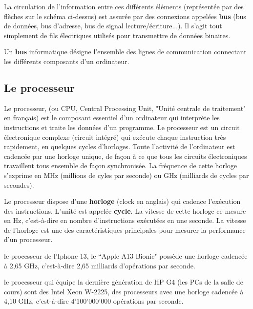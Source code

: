 La circulation de l’information entre ces différents éléments (représentée par des flèches sur le schéma ci-dessus) est assurée par des connexions appelées \textbf{bus} (bus de données, bus d’adresse, bus de signal lecture/écriture...). Il s’agit tout simplement de fils électriques utilisés pour transmettre de données binaires.
\begin{mydefinition}
	Un \textbf{bus} informatique désigne l'ensemble des lignes de communication connectant les différents composants d'un ordinateur.
\end{mydefinition}


\subsection{Le processeur}
Le processeur, (ou CPU, Central Processing Unit, "Unité centrale de traitement" en français) est le composant essentiel d’un ordinateur qui interprète les instructions et traite les données d’un programme.
Le processeur est un circuit électronique complexe (circuit intégré) qui exécute chaque instruction très rapidement, en quelques cycles d’horloges. Toute l’activité de l’ordinateur est cadencée par une horloge unique, de façon à ce que tous les circuits électroniques travaillent tous ensemble de façon synchronisée. La fréquence de
cette horloge s’exprime en MHz (millions de cyles par seconde) ou GHz (milliards de cycles par secondes). 
\begin{important}
	Le processeur dispose d'une \textbf{horloge} (clock en anglais)  qui cadence l'exécution des instructions. L'unité est appelée \textbf{cycle}. La vitesse de cette horloge ce mesure en Hz, c'est-à-dire en nombre d'instructions exécutées en une seconde. La vitesse de l'horloge est une des caractéristiques principales pour mesurer la performance d'un processeur.
\end{important}

\begin{myexamples}
	\item le processeur de l'Iphone 13, le “Apple A13 Bionic" possède une horloge cadencée à 2,65 GHz, c'est-à-dire 2,65 milliards d'opérations par seconde.
	\item le processeur qui équipe la dernière génération de HP G4 (les PCs de la salle de cours) sont des Intel Xeon W-2225, des processeurs avec une horloge cadencée à 4,10 GHz, c'est-à-dire 4'100'000'000 opérations par seconde. 
\end{myexamples}
	
